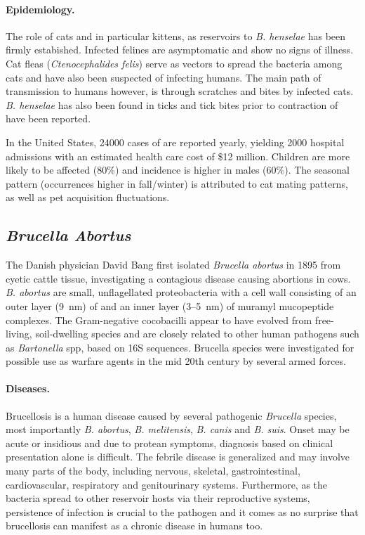 \paragraph{Epidemiology.}
The role of cats and in particular kittens, as reservoirs to \textit{B. henselae} has been firmly estabished. Infected felines are asymptomatic and show no signs of illness. Cat fleas (\textit{Ctenocephalides felis}) serve as vectors to spread the bacteria among cats and have also been suspected of infecting humans. The main path of transmission to humans however, is through scratches and bites by infected cats. \textit{B. henselae} has also been found in ticks and tick bites prior to contraction of  have been reported.

In the United States, 24000 cases of  are reported yearly, yielding 2000 hospital admissions with an estimated health care cost of \$12 million. Children are more likely to be affected (80\%) and incidence is higher in males (60\%). The seasonal pattern (occurrences higher in fall\slash winter) is attributed to cat mating patterns, as well as pet acquisition fluctuations.

\subsection{\textit{Brucella Abortus}}

The Danish physician David Bang first isolated \textit{Brucella abortus} in 1895 from cyetic cattle tissue, investigating a contagious disease causing abortions in cows. \textit{B. abortus} are small, unflagellated proteobacteria with a cell wall consisting of an outer layer (\SI{9}{\nano\meter}) of  and an inner layer (3--\SI{5}{\nano\meter}) of muramyl mucopeptide complexes. The Gram-negative cocobacilli appear to have evolved from free-living, soil-dwelling species and are closely related to other human pathogens such as \textit{Bartonella} \acrshort{spp}, based on 16S  sequences. Brucella species were investigated for possible use as warfare agents in the mid 20th century by several armed forces. \citep{Atluri2011,VonBargen2012}

\paragraph{Diseases.}
Brucellosis is a human disease caused by several pathogenic \textit{Brucella} species, most importantly \textit{B. abortus}, \textit{B. melitensis}, \textit{B. canis} and \textit{B. suis}. Onset may be acute or insidious and due to protean symptoms, diagnosis based on clinical presentation alone is difficult. The febrile disease is generalized and may involve many parts of the body, including nervous, skeletal, gastrointestinal, cardiovascular, respiratory and genitourinary systems. Furthermore, as the bacteria spread to other reservoir hosts via their reproductive systems, persistence of infection is crucial to the pathogen and it comes as no surprise that brucellosis can manifest as a chronic disease in humans too.

